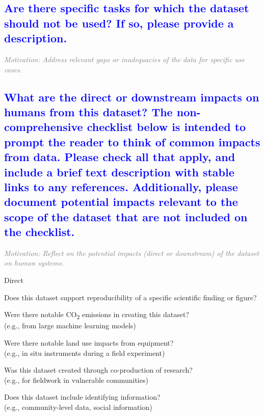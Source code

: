\documentclass[letterpaper, 10 pt, transmag]{IEEEtran}
\newcommand{\checked}{✓}
\begin{document}
\textcolor{blue}{\subsection{Are there specific tasks for which the dataset should not be used? If so,
please provide a description.}}
\textcolor{gray}{\textit{Motivation: Address relevant gaps or inadequacies of the data for specific use cases.}}

\textcolor{blue}{\subsection{What are the direct or downstream impacts on humans from this dataset? The non-comprehensive checklist below is intended to prompt the reader to think of common impacts from data. Please check all that apply, and include a brief text description with stable links to any references. Additionally, please document potential impacts relevant to the scope of the dataset that are not included on the checklist.}}
\textcolor{gray}{\textit{Motivation: Reflect on the potential impacts (direct or downstream) of the dataset on human systems.}}


Direct
\begin{todolist}
  \item Does this dataset support reproducibility of a specific scientific finding or figure?
  \item Were there notable CO\textsubscript{2} emissions in creating this dataset? \\ 
  (e.g., from large machine learning models)
  \item Were there notable land use impacts from equipment? \\
  (e.g., in situ instruments during a field experiment)
  \item Was this dataset created through co-production of research? \\
  (e.g., for fieldwork in vulnerable communities)
  \item Does this dataset include identifying information? \\
  (e.g., community-level data, social information) 
  

\end{todolist}
\end{document}

